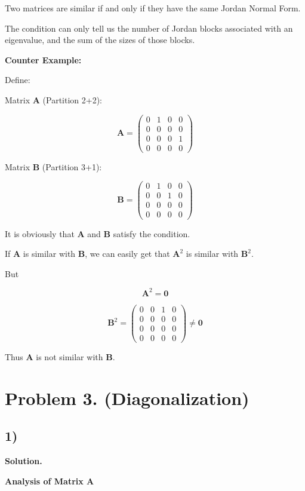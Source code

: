 \documentclass{article}
\newcommand{\0}{{\mathbf{0}}} %
\newcommand{\A}{{\mathbf{A}}} %
\newcommand{\B}{{\mathbf{B}}} %
\begin{document}
Two matrices are similar if and only if they have the same Jordan Normal Form.

The condition can only tell us the number of Jordan blocks associated with an eigenvalue,
and the sum of the sizes of those blocks.

\textbf{Counter Example:}

Define:

Matrix $\mathbf{A}$ (Partition 2+2):

$$\mathbf{A} =
\begin{pmatrix}
0 & 1 & 0 & 0 \\
0 & 0 & 0 & 0 \\
0 & 0 & 0 & 1 \\
0 & 0 & 0 & 0
\end{pmatrix}$$

Matrix $\mathbf{B}$ (Partition 3+1):

$$\mathbf{B} =
\begin{pmatrix}
0 & 1 & 0 & 0 \\
0 & 0 & 1 & 0 \\
0 & 0 & 0 & 0 \\
0 & 0 & 0 & 0
\end{pmatrix}$$

It is obviously that $\A$ and $\B$ satisfy the condition.

If $\A$ is similar with $\B$, we can easily get that $\A^2$ is similar with $\B^2$.

But

$$\mathbf{A}^2 = \mathbf{0}$$

$$\mathbf{B}^2 =
\begin{pmatrix} 0 & 0 & 1 & 0 \\ 0 & 0 & 0 & 0 \\ 0 & 0 & 0 & 0 \\ 0 & 0 & 0 & 0
\end{pmatrix} \neq \mathbf{0}$$

Thus $\A$ is not similar with $\B$.

\section*{Problem 3. (Diagonalization)}

\subsection*{1)}

\textbf{Solution.}

\textbf{Analysis of Matrix A}
\end{document}

